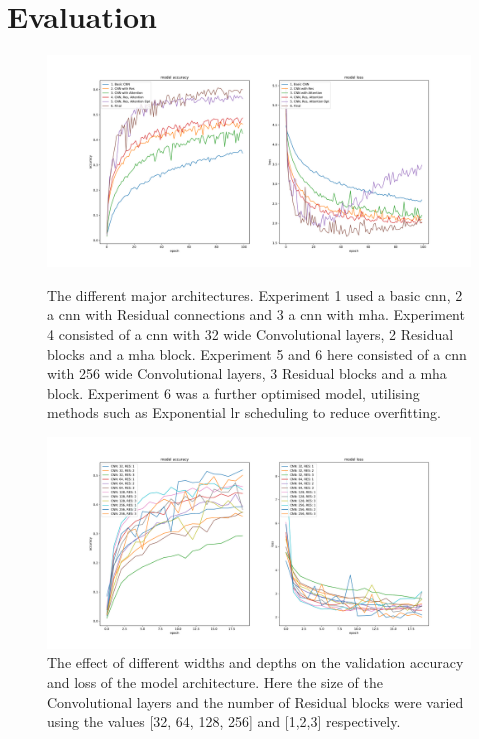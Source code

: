 \documentclass[11pt]{article}
\def\BESTWIDTH{256 }
\def\BESTDEPTH{3 }
\begin{document}
\section{Evaluation}
\setcounter{figure}{1}
\begin{figure}
  \centering
  \begin{minipage}[t]{0.45\textwidth}
    \centering
    \includegraphics[width=\textwidth]{Figures/all_experiments.pdf}
    \caption{The different major architectures. Experiment 1 used a basic \acrshort{cnn}, 2 a \acrshort{cnn} with Residual connections and 3 a \acrshort{cnn} with \acrshort{mha}. Experiment 4 consisted of a \acrshort{cnn} with 32 wide Convolutional layers, 2 Residual blocks and a \acrshort{mha} block. Experiment 5 and 6 here consisted of a \acrshort{cnn} with \BESTWIDTH wide Convolutional layers, \BESTDEPTH Residual blocks and a \acrshort{mha} block. Experiment 6 was a further optimised model, utilising methods such as Exponential \acrshort{lr} scheduling to reduce overfitting.}
    \label{fig: Major Experiments}
  \end{minipage}
  \hfill
  \begin{minipage}[t]{0.45\textwidth}
    \centering
    \includegraphics[width=\textwidth]{Figures/experiment_5_trials.pdf}
    \caption{The effect of different widths and depths on the validation accuracy and loss of the model architecture. Here the size of the Convolutional layers and the number of Residual blocks were varied using the values [32, 64, 128, 256] and [1,2,3] respectively.}
    \label{fig: Size Experiment}
  \end{minipage}
\end{figure}
\end{document}
